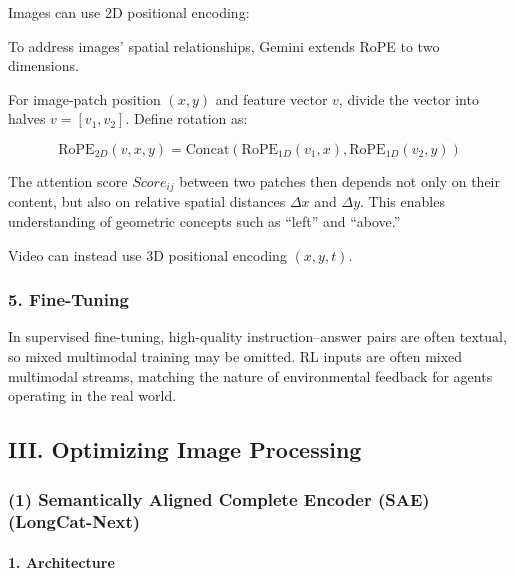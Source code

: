 Images can use 2D positional encoding:

To address images' spatial relationships, Gemini extends RoPE to two dimensions.

For image-patch position \((x,y)\) and feature vector \(v\), divide the vector into halves \(v=[v_1,v_2]\). Define rotation as:

\[
\mathrm{RoPE}_{2D}(v,x,y)=\mathrm{Concat}(\mathrm{RoPE}_{1D}(v_1,x),\mathrm{RoPE}_{1D}(v_2,y))
\]

The attention score \(Score_{ij}\) between two patches then depends not only on their content, but also on relative spatial distances \(\Delta x\) and \(\Delta y\). This enables understanding of geometric concepts such as ``left'' and ``above.''

Video can instead use 3D positional encoding \((x,y,t)\).

\hypertarget{fine-tuning}{%
\subsubsection{5. Fine-Tuning}\label{fine-tuning}}

In supervised fine-tuning, high-quality instruction--answer pairs are often textual, so mixed multimodal training may be omitted. RL inputs are often mixed multimodal streams, matching the nature of environmental feedback for agents operating in the real world.

\hypertarget{iii.-optimizing-image-processing}{%
\subsection{III. Optimizing Image Processing}\label{iii.-optimizing-image-processing}}

\hypertarget{semantically-aligned-complete-encoder-sae-longcat-next}{%
\subsubsection{(1) Semantically Aligned Complete Encoder (SAE) (LongCat-Next)}\label{semantically-aligned-complete-encoder-sae-longcat-next}}

\hypertarget{architecture}{%
\paragraph{1. Architecture}\label{architecture}}

